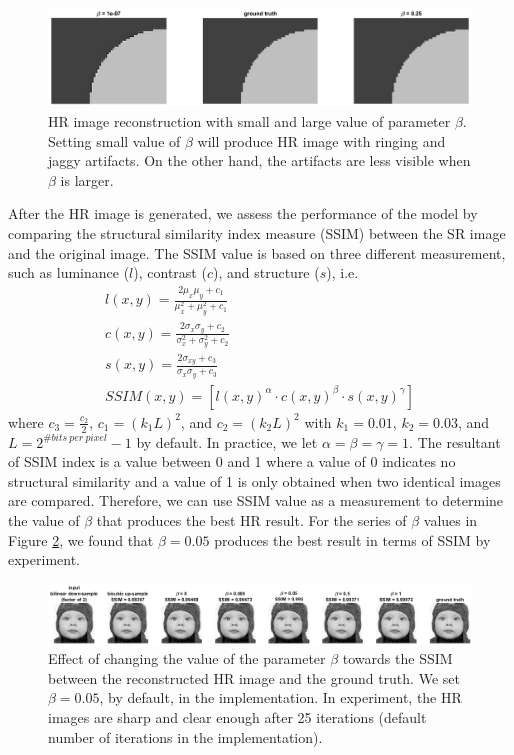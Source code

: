 \documentclass[a4paper,11pt]{article}
\begin{document}
\begin{figure}[H]
	\centering
	\includegraphics[width=1\textwidth]{large small beta.png}
	\caption{HR image reconstruction with small and large value of parameter $\beta$. Setting small value of $\beta$ will produce HR image with ringing and jaggy artifacts. On the other hand, the artifacts are less visible when $\beta$ is larger.}
	\label{fig:beta2}
\end{figure}
 
After the HR image is generated, we assess the performance of the model by comparing the structural similarity index measure (SSIM) between the SR image and the original image. The SSIM value is based on three different measurement, such as luminance ($l$), contrast ($c$), and structure ($s$), i.e.
\begin{gather*}
	l(x,y) = \frac{2 \mu_x \mu_y + c_1}{\mu_x^2 + \mu_y^2 + c_1}\\
	c(x,y) = \frac{2 \sigma_x \sigma_y + c_2}{\sigma_x^2 + \sigma_y^2 + c_2}\\
	s(x,y) = \frac{2 \sigma_{xy} + c_3}{\sigma_x \sigma_y + c_3}\\
	SSIM(x,y) = [l(x,y)^\alpha \cdot c(x,y)^\beta \cdot s(x,y)^\gamma]
\end{gather*}
where $c_3 = \frac{c_2}{2}$, $c_1=(k_1L)^2$, and $c_2=(k_2L)^2$ with $k_1=0.01$, $k_2=0.03$, and $L=2^{\#bits\ per\ pixel}-1$ by default. In practice, we let $\alpha = \beta = \gamma = 1$. The resultant of SSIM index is a value between 0 and 1 where a value of 0 indicates no structural similarity and a value of 1 is only obtained when two identical images are compared. Therefore, we can use SSIM value as a measurement to determine the value of $\beta$ that produces the best HR result. For the series of $\beta$ values in Figure \ref{fig:beta}, we found that $\beta = 0.05$ produces the best result in terms of SSIM by experiment.

\begin{figure}[H]
	\centering
	\includegraphics[width=1\textwidth]{beta.png}
	\caption{Effect of changing the value of the parameter $\beta$ towards the SSIM between the reconstructed HR image and the ground truth. We set $\beta = 0.05$, by default, in the implementation. In experiment, the HR images are sharp and clear enough after 25 iterations (default number of iterations in the implementation).}
	\label{fig:beta}
\end{figure}
\end{document}
